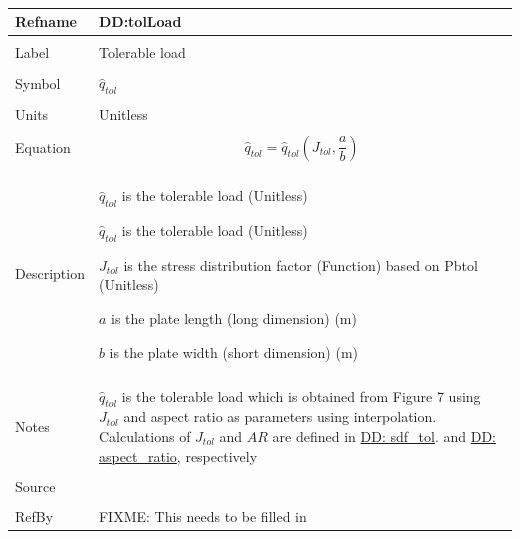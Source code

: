 \documentclass[12pt]{article}
\begin{document}
~\newline
\noindent \begin{minipage}{\textwidth}
\begin{tabular}{p{} p{}}
\toprule \textbf{Refname} & \textbf{DD:tolLoad}
\label{DD:tolLoad}
\\ \midrule \\
Label & Tolerable load
\\ \midrule \\
Symbol & ${\hat{q}_{tol}}$
\\ \midrule \\
Units & Unitless
\\ \midrule \\
Equation & \begin{dmath}
           {\hat{q}_{tol}}={\hat{q}_{tol}}\left({J_{tol}},\frac{a}{b}\right)
           \end{dmath}
\\ \midrule \\
Description & \begin{symbDescription}
              \item{${\hat{q}_{tol}}$ is the tolerable load (Unitless)}
              \item{${\hat{q}_{tol}}$ is the tolerable load (Unitless)}
              \item{${J_{tol}}$ is the stress distribution factor (Function) based on Pbtol (Unitless)}
              \item{$a$ is the plate length (long dimension) (m)}
              \item{$b$ is the plate width (short dimension) (m)}
              \end{symbDescription}
\\ \midrule \\
Notes & ${\hat{q}_{tol}}$ is the tolerable load which is obtained from Figure 7 using ${J_{tol}}$ and aspect ratio as parameters using interpolation. Calculations of ${J_{tol}}$ and $AR$ are defined in \hyperref[DD:sdf.tol]{DD: sdf\_tol}. and \hyperref[DD:aspect.ratio]{DD: aspect\_ratio}, respectively
\\ \midrule \\
Source & \cite{astm2009}
\\ \midrule \\
RefBy & FIXME: This needs to be filled in
\\ \bottomrule \end{tabular}
\end{minipage}\\
\end{document}
